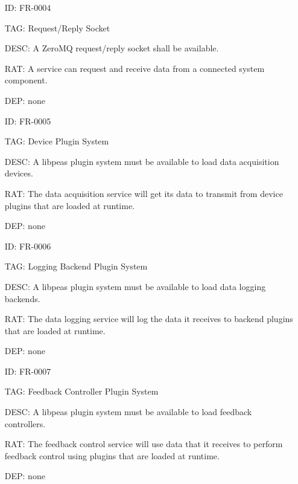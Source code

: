         \begin{itemize}
          \setlength{\itemindent}{.5in}
          \itemsep .15em
          \item[ID:] FR-0004
          \item[TAG:] Request/Reply Socket
          \item[DESC:] A ZeroMQ request/reply socket shall be available.
          \item[RAT:] A service can request and receive data from a connected
            system component.
          \item[DEP:] none
        \end{itemize}

        \begin{itemize}
          \setlength{\itemindent}{.5in}
          \itemsep .15em
          \item[ID:] FR-0005
          \item[TAG:] Device Plugin System
          \item[DESC:] A libpeas plugin system must be available to load data
            acquisition devices.
          \item[RAT:] The data acquisition service will get its data to
            transmit from device plugins that are loaded at runtime.
          \item[DEP:] none
        \end{itemize}

        \begin{itemize}
          \setlength{\itemindent}{.5in}
          \itemsep .15em
          \item[ID:] FR-0006
          \item[TAG:] Logging Backend Plugin System
          \item[DESC:] A libpeas plugin system must be available to load data
            logging backends.
          \item[RAT:] The data logging service will log the data it receives
            to backend plugins that are loaded at runtime.
          \item[DEP:] none
        \end{itemize}

        \begin{itemize}
          \setlength{\itemindent}{.5in}
          \itemsep .15em
          \item[ID:] FR-0007
          \item[TAG:] Feedback Controller Plugin System
          \item[DESC:] A libpeas plugin system must be available to load
            feedback controllers.
          \item[RAT:] The feedback control service will use data that it
            receives to perform feedback control using plugins that are
            loaded at runtime.
          \item[DEP:] none
        \end{itemize}

